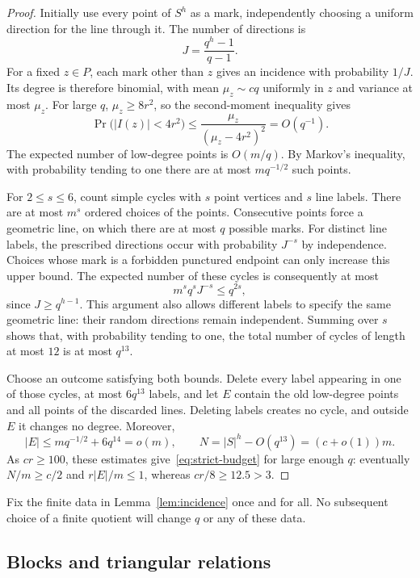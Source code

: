 \begin{proof}
Initially use every point of $S^h$ as a mark, independently choosing a uniform direction for the line through it. The number of directions is
\[
 J=\frac{q^h-1}{q-1}.
\]
For a fixed $z\in P$, each mark other than $z$ gives an incidence with probability $1/J$. Its degree is therefore binomial, with mean $\mu_z\sim cq$ uniformly in $z$ and variance at most $\mu_z$. For large $q$, $\mu_z\ge8r^2$, so the second-moment inequality gives
\[
 \Pr\bigl(|I(z)|<4r^2\bigr)
 \le \frac{\mu_z}{(\mu_z-4r^2)^2}=O(q^{-1}).
\]
The expected number of low-degree points is $O(m/q)$. By Markov's inequality, with probability tending to one there are at most $m q^{-1/2}$ such points.

For $2\le s\le6$, count simple cycles with $s$ point vertices and $s$ line labels. There are at most $m^s$ ordered choices of the points. Consecutive points force a geometric line, on which there are at most $q$ possible marks. For distinct line labels, the prescribed directions occur with probability $J^{-s}$ by independence. Choices whose mark is a forbidden punctured endpoint can only increase this upper bound. The expected number of these cycles is consequently at most
\[
 m^s q^s J^{-s}\le q^{2s},
\]
since $J\ge q^{h-1}$. This argument also allows different labels to specify the same geometric line: their random directions remain independent. Summing over $s$ shows that, with probability tending to one, the total number of cycles of length at most $12$ is at most $q^{13}$.

Choose an outcome satisfying both bounds. Delete every label appearing in one of those cycles, at most $6q^{13}$ labels, and let $E$ contain the old low-degree points and all points of the discarded lines. Deleting labels creates no cycle, and outside $E$ it changes no degree. Moreover,
\[
 |E|\le m q^{-1/2}+6q^{14}=o(m),\qquad
 N=|S|^h-O(q^{13})=(c+o(1))m.
\]
As $cr\ge100$, these estimates give~\eqref{eq:strict-budget} for large enough $q$: eventually $N/m\ge c/2$ and $r|E|/m\le1$, whereas $cr/8\ge12.5>3$.
\end{proof}

Fix the finite data in Lemma~\ref{lem:incidence} once and for all. No subsequent choice of a finite quotient will change $q$ or any of these data.

\subsection{Blocks and triangular relations}

